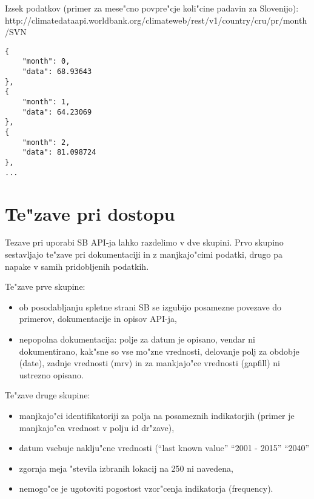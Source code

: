 Izsek podatkov (primer za mese"cno povpre"cje koli"cine padavin za Slovenijo):
http://climatedataapi.worldbank.org/climateweb/rest/v1/country/cru/pr/month/SVN

\begin{lstlisting}
{
    "month": 0,
    "data": 68.93643
},
{
    "month": 1,
    "data": 64.23069
},
{
    "month": 2,
    "data": 81.098724
},
...
\end{lstlisting}











\section{Te"zave pri dostopu}


Tezave pri uporabi SB API-ja lahko razdelimo v dve skupini. Prvo skupino
sestavljajo te"zave pri dokumentaciji in z manjkajo"cimi podatki, drugo pa
napake v samih pridobljenih podatkih.

Te"zave prve skupine:

\begin{itemize}  
\item ob posodabljanju spletne strani SB se izgubijo posamezne povezave do 
  primerov, dokumentacije in opisov API-ja,
\item nepopolna dokumentacija:
\subitem polje za datum je opisano, vendar ni dokumentirano, kak"sne so vse mo"zne 
    vrednosti,
\subitem delovanje polj za obdobje (date), zadnje vrednosti (mrv) in za mankjajo"ce
    vrednosti (gapfill) ni ustrezno opisano.
\end{itemize}  

Te"zave druge skupine:


\begin{itemize}  
\item manjkajo"ci identifikatoriji za polja na posameznih indikatorjih (primer je
  manjkajo"ca vrednost v polju id dr"zave),
\item datum vsebuje naklju"cne vrednosti (``last known value'' ``2001 - 2015'' ``2040''
\item zgornja meja "stevila izbranih lokacij na 250 ni navedena,
\item nemogo"ce je ugotoviti pogostost vzor"cenja indikatorja (frequency).
\end{itemize}  







